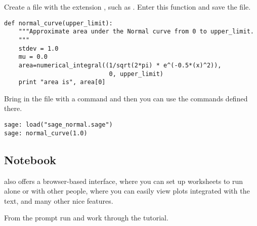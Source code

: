 Create a file with the extension , such as .
Enter this function and save the file.
\begin{lstlisting}[style=python]
def normal_curve(upper_limit):
    """Approximate area under the Normal curve from 0 to upper_limit.
    """
    stdev = 1.0
    mu = 0.0
    area=numerical_integral((1/sqrt(2*pi) * e^(-0.5*(x)^2)),
                             0, upper_limit)    
    print "area is", area[0]
\end{lstlisting}
Bring in the file with a  command
and then you can use the commands defined there.
\begin{lstlisting}[style=python]
sage: load("sage_normal.sage")
sage: normal_curve(1.0)   
\end{lstlisting}


\subsection{Notebook}
\Sage{} also offers a browser-based interface, where you can set up
worksheets to run alone or with other people, where you can easily
view plots integrated with the text, and many other nice features.

From the \Sage{} prompt run  and
work through the tutorial.
\endinput


TODO:
  1) how to use notebook to do exercises?